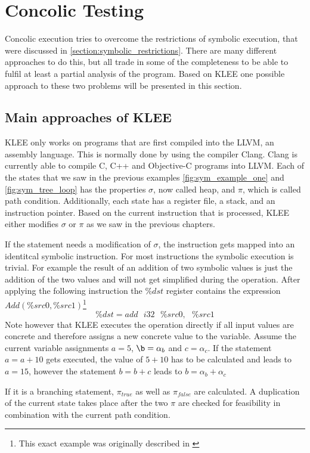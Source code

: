 \section{Concolic Testing} \label{section:concolic_testing}
Concolic execution tries to overcome the restrictions of symbolic execution, that were discussed in \ref{section:symbolic_restrictions}. There are many different approaches to do this, but all trade in some of the completeness to be able to fulfil at least a partial analysis of the program.
Based on KLEE \cite{Cadar:2008:KUA:1855741.1855756} one possible approach to these two problems will be presented in this section.

\subsection{Main approaches of KLEE}
KLEE only works on programs that are first compiled into the LLVM, an assembly language. This is normally done by using the compiler Clang. Clang is currently able to compile C, C++  and Objective-C programs into LLVM.
Each of the states that we saw in the previous examples \ref{fig:sym_example_one} and \ref{fig:sym_tree_loop} has the properties $\sigma$, now called heap, and $\pi$, which is called path condition. Additionally, each state has a register file, a stack, and an instruction pointer. Based on the current instruction that is processed, KLEE either modifies $\sigma$ or $\pi$ as we saw in the previous chapters.

If the statement needs a modification of $\sigma$, the instruction gets mapped into an identitcal symbolic instruction. For most instructions the symbolic execution is trivial. For example the result of an addition of two symbolic values is just the addition of the two values and will not get simplified during the operation. After applying the following instruction the $\%dst$ register contains the expression $Add(\%src0, \%src1)$\footnote{This exact example was originally described in \cite{Cadar:2008:KUA:1855741.1855756}}
$$\%dst = add\text{ }i32\text{ }\%src0,\text{ }\%src1$$
Note however that KLEE executes the operation directly if all input values are concrete and therefore assigns a new concrete value to the variable.
Assume the current variable assignments $a = 5$, $\b = \alpha_b$ and $c=\alpha_c$. If the statement $a = a + 10$ gets executed, the value of $5 + 10$ has to be calculated and leads to $a = 15$, however the statement $b = b + c$ leads to $b = \alpha_b + \alpha_c$

If it is a branching statement, $\pi_{true}$ as well as $\pi_{false}$ are calculated. A duplication of the current state takes place after the two $\pi$ are checked for feasibility in combination with the current path condition.

